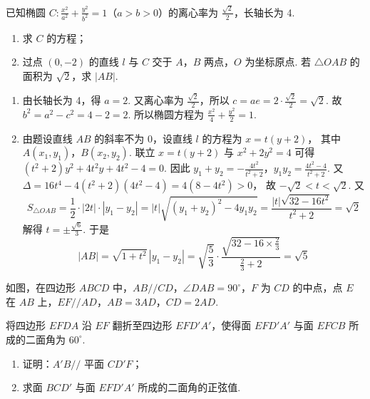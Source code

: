 \documentclass[UTF8,a4paper,oneside,11pt]{ctexbook}
\begin{document}
\begin{problem}
已知椭圆 \(C:\frac{x^2}{a^2}+\frac{y^2}{b^2}=1\)（\(a>b>0\)）的离心率为 \(\frac{\sqrt2}{2}\)，长轴长为 4.
\begin{enumerate}
\item 求 \(C\) 的方程；
\item 过点 \((0,-2)\) 的直线 \(l\) 与 \(C\) 交于 \(A\)，\(B\) 两点，\(O\) 为坐标原点. 若 \(\triangle OAB\) 的面积为 \(\sqrt2\)，求 \(|AB|\).
\end{enumerate}
\end{problem}

\begin{solution}
\begin{enumerate}
\item 由长轴长为 4，得 \(a=2\). 又离心率为 \(\frac{\sqrt2}{2}\)，所以
\(c=ae=2\cdot \frac{\sqrt2}{2}=\sqrt2\).
故
\(b^2=a^2-c^2=4-2=2\).
所以椭圆方程为
\(\frac{x^2}{4}+\frac{y^2}{2}=1\).

\item 由题设直线 \(AB\) 的斜率不为 0，设直线 \(l\) 的方程为
\(x=t(y+2)\)，
其中 \(A(x_1,y_1)\)，\(B(x_2,y_2)\). 联立 \(x=t(y+2)\) 与 \(x^2+2y^2=4\)
可得
\((t^2+2)y^2+4t^2y+4t^2-4=0\).
因此
\(y_1+y_2=-\frac{4t^2}{t^2+2}\)，\(y_1y_2=\frac{4t^2-4}{t^2+2}\).
又
\(
\Delta=16t^4-4(t^2+2)(4t^2-4)=4(8-4t^2)>0
\)，
故
\(-\sqrt2<t<\sqrt2\).
又
\[
S_{\triangle OAB}=\frac12\cdot |2t|\cdot |y_1-y_2|
=|t|\sqrt{(y_1+y_2)^2-4y_1y_2}
=\frac{|t|\sqrt{32-16t^2}}{t^2+2}
=\sqrt2
\]
解得
\(t=\pm \frac{\sqrt6}{3}\).
于是
\[
|AB|=\sqrt{1+t^2}\,|y_1-y_2|
=\sqrt{\frac53}\cdot\frac{\sqrt{32-16\times\frac23}}{\frac23+2}
=\sqrt5
\]
\end{enumerate}
\end{solution}

\begin{problem}
如图，在四边形 \(ABCD\) 中，\(AB//CD\)，\(\angle DAB=90^\circ\)，\(F\) 为 \(CD\) 的中点，点 \(E\) 在 \(AB\) 上，\(EF//AD\)，\(AB=3AD\)，\(CD=2AD\).

将四边形 \(EFDA\) 沿 \(EF\) 翻折至四边形 \(EFD'A'\)，使得面 \(EFD'A'\) 与面 \(EFCB\) 所成的二面角为 \(60^\circ\).
\begin{enumerate}
\item 证明：\(A'B//\) 平面 \(CD'F\)；
\item 求面 \(BCD'\) 与面 \(EFD'A'\) 所成的二面角的正弦值.
\end{enumerate}

\end{problem}
\end{document}
